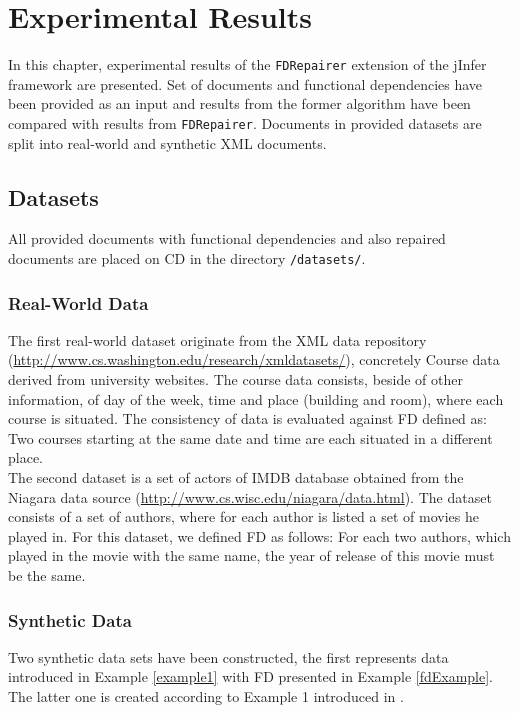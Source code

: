 \chapter{Experimental Results}

In this chapter, experimental results of the \texttt{FDRepairer} extension of the jInfer framework are presented. Set of documents and functional dependencies have been provided as an input and results from the former algorithm have been compared with results from \texttt{FDRepairer}. Documents in provided datasets are split into real-world and synthetic XML documents.

\section{Datasets}

All provided documents with functional dependencies and also repaired documents are placed on CD in the directory \texttt{/datasets/}.

\subsection{Real-World Data}

The first real-world dataset originate from the XML data repository \\(\url{http://www.cs.washington.edu/research/xmldatasets/}), concretely Course data derived from university websites. The course data consists, beside of other information, of day of the week, time and place (building and room), where each course is situated. The consistency of data is evaluated against FD defined as: Two courses starting at the same date and time are each situated in a different place.\\

The second dataset is a set of actors of IMDB database obtained from the Niagara data source (\url{http://www.cs.wisc.edu/niagara/data.html}). The dataset consists of a set of authors, where for each author is listed a set of movies he played in. For this dataset, we defined FD as follows: For each two authors, which played in the movie with the same name, the year of release of this movie must be the same.

\subsection{Synthetic Data}

Two synthetic data sets have been constructed, the first represents data introduced in Example \ref{example1} with FD presented in Example \ref{fdExample}. The latter one is created according to Example 1 introduced in \cite{ImprovingXML}.

